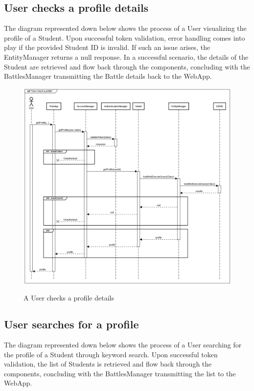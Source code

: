 \documentclass{Configuration_Files/Template}
\begin{document}
\subsection{User checks a profile details}

The diagram represented down below shows the process of a User visualizing the profile of a Student. Upon successful token validation, error handling comes into play if the provided Student ID is invalid. If such an issue arises, the EntityManager returns a null response. In a successful scenario, the details of the Student are retrieved and flow back through the components, concluding with the BattlesManager transmitting the Battle details back to the WebApp.

\begin{figure}[H]
\centering
\includegraphics[scale = 0.33]{Images/diagrams/sequences/getProfile.png}\\
\caption{A User checks a profile details}
\end{figure}

\subsection{User searches for a profile}

The diagram represented down below shows the process of a User searching for the profile of a Student through keyword search. Upon successful token validation, the list of Students is retrieved and flow back through the components, concluding with the BattlesManager transmitting the list to the WebApp.
\end{document}
